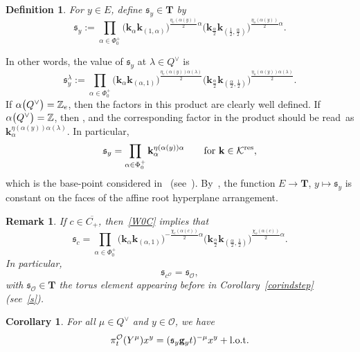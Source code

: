\documentclass[pdftex]{sigma}
\numberwithin{equation}{section}
\newtheorem{Corollary}[Theorem]{Corollary}
\newtheorem{Definition}[Theorem]{Definition}
\newtheorem{Remark}[Theorem]{Remark} }
\begin{document}
\begin{Definition}
For $y\in E$, define $\mathfrak{s}_y\in\mathbf{T}$ by
\[
\mathfrak{s}_y:=\prod_{\alpha\in\Phi_0^+}\bigl(\mathbf{k}_\alpha\mathbf{k}_{(1,\alpha)}\bigr)^{\frac{\eta_e(\alpha(y))}{2}\alpha}
\bigl(\mathbf{k}_{\frac{\alpha}{2}}\mathbf{k}_{(\frac{1}{2},\frac{\alpha}{2})}\bigr)^{\frac{\eta_o(\alpha(y))}{2}\alpha}.
\]
\end{Definition}

In other words, the value of $\mathfrak{s}_y$ at $\lambda\in Q^\vee$ is
\begin{equation*}%
\mathfrak{s}_y^\lambda:=\prod_{\alpha\in\Phi_0^+}\bigl(\mathbf{k}_\alpha\mathbf{k}_{(\alpha,1)}\bigr)^{\frac{\eta_e(\alpha(y))\alpha(\lambda)}{2}}
\bigl(\mathbf{k}_{\frac{\alpha}{2}}\mathbf{k}_{(\frac{\alpha}{2},\frac{1}{2})}\bigr)^{\frac{\eta_o(\alpha(y))\alpha(\lambda)}{2}}.
\end{equation*}
If $\alpha\smash{\bigl(Q^\vee\bigr)}=\mathbb{Z}_e$, then the factors in this product are clearly well defined.
If $\alpha\smash{\bigl(Q^\vee\bigr)}=\mathbb{Z}$, then , and the corresponding factor in the
product should be read~as $\mathbf{k}_\alpha^{\eta(\alpha(y))\alpha(\lambda)}$. In particular,
\[
\mathfrak{s}_y=\prod_{\alpha\in\Phi_0^+}\mathbf{k}_\alpha^{\eta(\alpha(y))\alpha}\qquad \textup{for}\ \mathbf{k}\in\mathcal{K}^{{\rm res}},
\]
which is the base-point considered in~\cite{SSV2} (see~\cite[Definition~5.1]{SSV2}). By~\cite[Lemma~2.5]{SSV2}, the function $E\rightarrow \mathbf{T}$, $y\mapsto\mathfrak{s}_y$ is constant on the faces of the affine root hyperplane arrangement.

\begin{Remark}%
If $c\in\overline{C_+}$, then~\eqref{W0C} implies that
\[
\mathfrak{s}_c=\prod_{\alpha\in\Phi_0^+}\bigl(\mathbf{k}_{\alpha}\mathbf{k}_{(\alpha,1)}\bigr)^{-\frac{\chi_e(\alpha(c))}{2}\alpha}
\bigl(\mathbf{k}_{\frac{\alpha}{2}}\mathbf{k}_{(\frac{\alpha}{2},\frac{1}{2})}\bigr)^{\frac{\chi_o(\alpha(c))}{2}\alpha}.
\]
In particular,
\[
\mathfrak{s}_{c^\mathcal{O}}=\mathfrak{s}_\mathcal{O},
\]
with $\mathfrak{s}_\mathcal{O}\in\mathbf{T}$ the torus element appearing before in Corollary~\ref{corindstep} (see~\eqref{s}).
\end{Remark}

\begin{Corollary}\label{Ytriang}
For all $\mu\in Q^\vee$ and $y\in\mathcal{O}$, we have
\[
\pi_{t}^\mathcal{O}(Y^\mu)x^{y}= (\mathfrak{s}_y\mathbf{g}_yt)^{-\mu}x^y+ {\rm l.o.t.}
\]
\end{Corollary}
\end{document}
